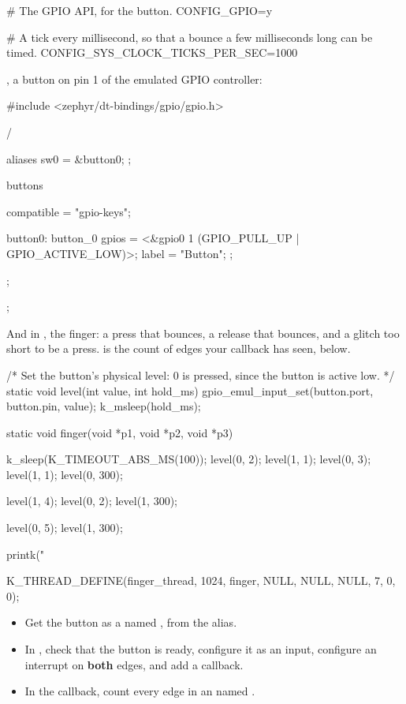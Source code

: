 \begin{kconfigcode}
# The GPIO API, for the button.
CONFIG_GPIO=y

# A tick every millisecond, so that a bounce a few milliseconds long can be timed.
CONFIG_SYS_CLOCK_TICKS_PER_SEC=1000
\end{kconfigcode}

, a button on pin 1 of the emulated GPIO controller:

\begin{dtscode}
#include <zephyr/dt-bindings/gpio/gpio.h>

/ {
	aliases {
		sw0 = &button0;
	};

	buttons {
		compatible = "gpio-keys";

		button0: button_0 {
			gpios = <&gpio0 1 (GPIO_PULL_UP | GPIO_ACTIVE_LOW)>;
			label = "Button";
		};
	};
};
\end{dtscode}

And in , the finger: a press that bounces, a release that bounces, and a glitch too
short to be a press.  is the count of edges your callback has seen, below.

\begin{ccode}
/* Set the button's physical level: 0 is pressed, since the button is active low. */
static void level(int value, int hold_ms)
{
	gpio_emul_input_set(button.port, button.pin, value);
	k_msleep(hold_ms);
}

static void finger(void *p1, void *p2, void *p3)
{
	k_sleep(K_TIMEOUT_ABS_MS(100));
	level(0, 2);
	level(1, 1);
	level(0, 3);
	level(1, 1);
	level(0, 300);

	level(1, 4);
	level(0, 2);
	level(1, 300);

	level(0, 5);
	level(1, 300);

	printk("%
}

K_THREAD_DEFINE(finger_thread, 1024, finger, NULL, NULL, NULL, 7, 0, 0);
\end{ccode}

\label{c3:ex:3.1}

\begin{itemize}
  \item Get the button as a  named , from the  alias.
  \item In , check that the button is ready, configure it as an input, configure an interrupt
    on \textbf{both} edges, and add a callback.
  \item In the callback, count every edge in an  named .
\end{itemize}

